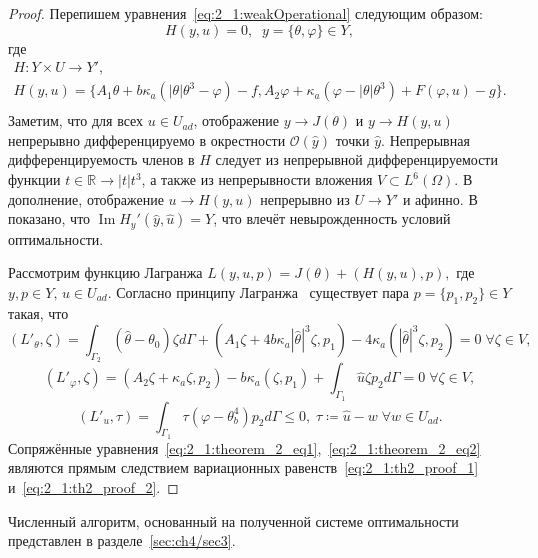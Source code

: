 \begin{proof}
    Перепишем уравнения~\eqref{eq:2_1:weakOperational} следующим образом:
    \[ H(y,u) = 0,\;\; y = \{\theta,\varphi\} \in Y, \]
    где
    \begin{gather*}
        H:Y \times U \to Y',\\
        H(y,u) =\{A_1 \theta + b \kappa_a (| \theta | \theta^3 - \varphi ) - f,
        A_2 \varphi + \kappa_a (\varphi - |\theta|\theta^3) + F(\varphi, u) - g \}.\\
    \end{gather*}
    Заметим, что для всех $u \in U_{ad}$, отображение
    $y \to J(\theta) $ и $y \to H(y,u)$ непрерывно
    дифференцируемо в окрестности $\mathcal{O}(\hat{y})$ точки $\hat{y}$.
    Непрерывная дифференцируемость членов в $H$ следует из непрерывной дифференцируемости
    функции $t \in \mathbb{R} \to | t | t^3$,
    а также из непрерывности вложения  $V \subset L^6(\Omega)$.
    В дополнение, отображение $u \to H(y,u)$ непрерывно из $U \to Y'$ и афинно.
    В~\cite{Kovtanyuk2014TheoreticalAnalysis} показано,
    что $\operatorname{Im}H_y'(\hat{y}, \hat{u}) = Y$,
    что влечёт невырожденность условий оптимальности.

    Рассмотрим функцию Лагранжа
    $L(y,u,p) = J(\theta) + (H(y,u),p),$ где $y,p \in Y,\, u \in U_{ad}$.
    Согласно принципу Лагранжа~\cite[Гл.2, теорема 1.5]{11}
    существует пара $p = \{p_1,p_2\} \in Y$ такая, что
    \begin{equation}
        \label{eq:2_1:th2_proof_1}
        (L'_\theta,\zeta) =\int_{\Gamma_2}(\hat\theta -\theta_0) \zeta d\Gamma
        + (A_1 \zeta + 4b\kappa_a |\hat\theta|^3 \zeta,p_1)
        - 4\kappa_a(|\hat\theta|^3 \zeta,p_2) = 0 \; \forall \zeta \in V,
    \end{equation}
    \begin{equation}
        \label{eq:2_1:th2_proof_2}
        (L'_\varphi, \zeta) = (A_2 \zeta + \kappa_a \zeta, p_2)
        - b \kappa_a(\zeta,p_1)
        + \int_{\Gamma_1} \hat u \zeta p_2 d\Gamma = 0 \; \forall \zeta \in V,
    \end{equation}
    \begin{equation}
        \label{eq:2_1:th2_proof_3}
        (L'_u,\tau) = \int_{\Gamma_1} \tau (\varphi - \theta^4_b) p_2 d\Gamma  \leq 0,
        \; \tau \coloneqq \hat u - w \; \forall w \in U_{ad}.
    \end{equation}
    Сопряжённые уравнения~\eqref{eq:2_1:theorem_2_eq1},~\eqref{eq:2_1:theorem_2_eq2}
    являются прямым следствием
    вариационных равенств~\eqref{eq:2_1:th2_proof_1} и~\eqref{eq:2_1:th2_proof_2}.
\end{proof}

Численный алгоритм, основанный на полученной системе
оптимальности представлен в разделе~\ref{sec:ch4/sec3}.
\FloatBarrier
